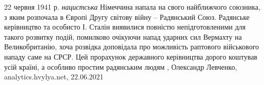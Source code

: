22 червня 1941 р. \emph{нацистська} Німеччина напала на свого найближчого союзника, з
яким розпочала в Європі Другу світову війну – Радянський Союз. Радянське
керівництво та особисто І. Сталін виявилися повністю непідготовленими для такого
розвитку подій, помилково очікуючи напад ударних сил Вермахту на
Великобританію, хоча розвідка доповідала про можливість раптового військового
нападу саме на СРСР. Цей прорахунок державного керівництва дорого коштував усій
країні, а особливо простим радянським людям
, 
Олександр Левченко, analytics.hvylya.net, 22.06.2021

